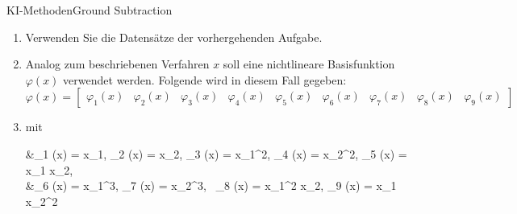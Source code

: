 \documentclass[169, handout	]{THIbeamer} %
\begin{document}
\begin{frame}{KI-Methoden}{Ground Subtraction}
	\begin{enumerate}
		\item Verwenden Sie die Datensätze der vorhergehenden Aufgabe.
		\item Analog zum beschriebenen Verfahren $x$ soll eine nichtlineare Basisfunktion $\varphi (x)$ verwendet werden. Folgende wird in diesem Fall gegeben:
		\begin{equation*}
			\varphi (x) = 
			\begin{bmatrix}
				\varphi_1(x) & \varphi_2(x) & \varphi_3(x) & \varphi_4(x) & \varphi_5(x) &
				\varphi_6(x) & \varphi_7(x) & \varphi_8(x) & \varphi_9(x)
			\end{bmatrix}
		\end{equation*}
		\item[] mit
		\begin{flalign}
			&\varphi_1 (x) = x_1, \hspace{0.2 cm} \varphi_2 (x) = x_2, \hspace{0.2 cm} 						\varphi_3 (x) = x_1^2, \hspace{0.2 cm} \varphi_4 (x) = x_2^2, \hspace{0.2 cm} 
			\varphi_5 (x) = x_1 x_2, \nonumber \\
			&\varphi_6 (x) = x_1^3,\hspace{0.2 cm} \varphi_7 (x) = x_2^3,\hspace{0.2 cm} \
			\varphi_8 (x) = x_1^2 x_2, \hspace{0.2 cm}  \varphi_9 (x) = x_1 x_2^2 \nonumber
		\end{flalign}
	\end{enumerate}
\end{frame}
\end{document}
